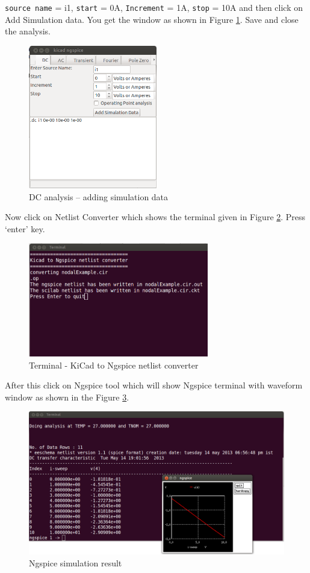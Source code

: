  {\tt source name} = i1, {\tt start} = 0A, {\tt Increment} = 1A, {\tt stop} = 10A and then click on Add Simulation data. You get the window as shown in Figure \ref{12}. Save and close the analysis.
\begin{figure}[t]
\centering
\includegraphics[width=0.5\textwidth]{figures/12}
\caption{DC analysis -- adding simulation data}
\label{12}
\end{figure}
Now click on Netlist Converter which shows the  terminal given in Figure \ref{13}. Press `enter' key.
\begin{figure}[t]
\centering
\includegraphics[width=0.7\textwidth]{figures/13}
\caption{Terminal - KiCad to Ngspice netlist converter}
\label{13}
\end{figure}
After this click on Ngspice tool which will show Ngspice terminal with waveform window as shown in the Figure \ref{14}.
\begin{figure}[t]
\centering
\includegraphics[width=\textwidth]{figures/14}
\caption{Ngspice simulation result}
\label{14}
\end{figure}
